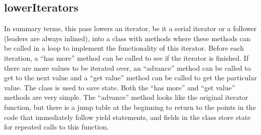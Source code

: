 \documentclass[10pt]{article}
\begin{document}
\subsection{lowerIterators}
\label{sec:lowerIterators}

In summary terms, this pass lowers an iterator, be it a serial
iterator or a follower (leaders are always inlined), into a class with
methods where these methods can be called in a loop to implement the
functionality of this iterator.  Before each iteration, a ``has more''
method can be called to see if the iterator is finished.  If there are
more values to be iterated over, an ``advance'' method can be called
to get to the next value and a ``get value'' method can be called to
get the particular value.  The class is used to save state.  Both the
``has more'' and ``get value'' methods are very simple.  The
``advance'' method looks like the original iterator function, but
there is a jump table at the beginning to return to the points in the
code that immediately follow yield statements, and fields in the class
store state for repeated calls to this function.
\end{document}
